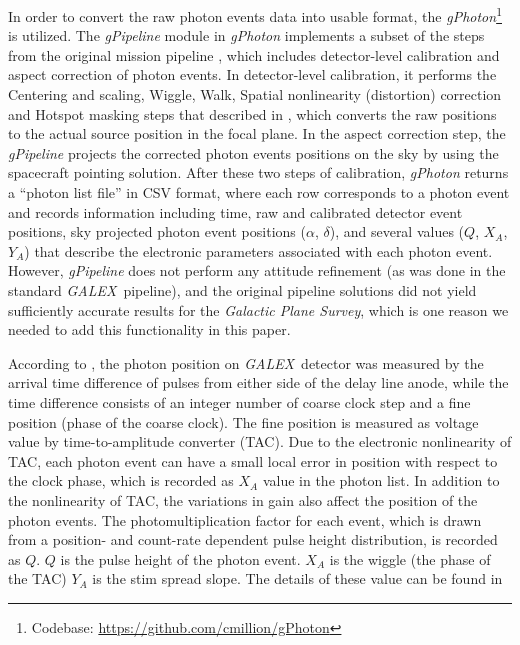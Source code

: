 \documentclass[12pt, preprint]{aastex}
\newcommand{\project}[1]{\textsl{#1}}
\newcommand{\galex}{\project{GALEX}}
\begin{document}
In order to convert the raw photon events data into usable format, the \project{gPhoton}\footnote{Codebase: \url{https://github.com/cmillion/gPhoton} } \citep[][]{gPhoton_code} is utilized.
The \project{gPipeline} module in \project{gPhoton} implements a subset of the steps from the original mission pipeline \citep{galex_cal}, which includes detector-level calibration and aspect correction of photon events.
In detector-level calibration, it performs the Centering and scaling, Wiggle, Walk, Spatial nonlinearity (distortion) correction and Hotspot masking steps that described in \cite{galex_cal}, which converts the raw positions to the actual source position in the focal plane.
In the aspect correction step, the \project{gPipeline} projects the corrected photon events positions on the sky by using the spacecraft pointing solution.
After these two steps of calibration, \project{gPhoton} returns a “photon list file” in CSV format, where each row corresponds to a photon event and records information including time, raw and calibrated detector event positions, sky projected photon event positions ($\alpha$, $\delta$), and several values ($Q$, $X_A$, $Y_A$) that describe the electronic parameters associated with each photon event.
However, \project{gPipeline} does not perform any attitude refinement (as was done in the standard \galex\ pipeline), and the original pipeline solutions did not yield sufficiently accurate results for the \project{Galactic Plane Survey}, which is one reason we needed to add this functionality in this paper.

According to \cite{galex_cal}, the photon position on \galex\ detector was measured by the arrival time difference of pulses from either side of the delay line anode, while the time difference consists of an integer number of coarse clock step and a fine position (phase of the coarse clock).
The fine position is measured as voltage value by time-to-amplitude converter (TAC).
Due to the electronic nonlinearity of TAC, each photon event can have a small local error in position with respect to the clock phase, which is recorded as $X_A$ value in the photon list.
In addition to the nonlinearity of TAC, the variations in gain also affect the position of the photon events.
The photomultiplication factor for each event, which is drawn from a position- and count-rate dependent pulse height distribution, is recorded as $Q$.
$Q$ is the pulse height of the photon event.
$X_A$ is the wiggle (the phase of the TAC)
$Y_A$ is the stim spread slope.
The details of these value can be found in \cite{galex_cal}
\end{document}
